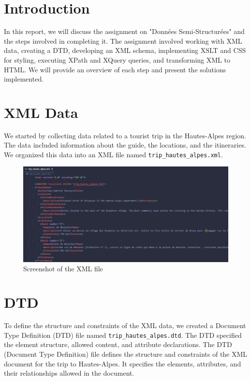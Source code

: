 \documentclass[12pt]{report}
\begin{document}
\newpage

\tableofcontents
\listoffigures
\newpage
\section{Introduction}
In this report, we will discuss the assignment on "Données Semi-Structurées" and the steps involved in completing it. The assignment involved working with XML data, creating a DTD, developing an XML schema, implementing XSLT and CSS for styling, executing XPath and XQuery queries, and transforming XML to HTML. We will provide an overview of each step and present the solutions implemented.

\section{XML Data}
We started by collecting data related to a tourist trip in the Hautes-Alpes region. The data included information about the guide, the locations, and the itineraries. We organized this data into an XML file named \texttt{trip\_hautes\_alpes.xml}.
\begin{figure}[htbp]
	\centering
	\includegraphics[width=1.0\textwidth]{xml.png}
	\caption{Screenshot of the XML file}
	\label{fig:screenshot}
  \end{figure}
\section{DTD}
To define the structure and constraints of the XML data, we created a Document Type Definition (DTD) file named \texttt{trip\_hautes\_alpes.dtd}. The DTD specified the element structure, allowed content, and attribute declarations.
The DTD (Document Type Definition) file defines the structure and constraints of the XML document for the trip to Hautes-Alpes. It specifies the elements, attributes, and their relationships allowed in the document.
\end{document}
